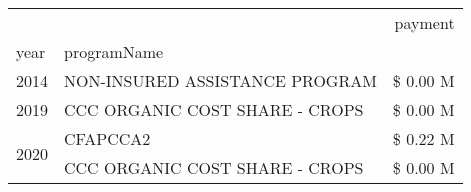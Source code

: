 \begin{tabular}{llr}
\toprule
 &  & payment \\
year & programName &  \\
\midrule
2014 & NON-INSURED ASSISTANCE PROGRAM & \$ 0.00 M \\
\cline{1-3}
2019 & CCC ORGANIC COST SHARE - CROPS & \$ 0.00 M \\
\cline{1-3}
\multirow[t]{2}{*}{2020} & CFAPCCA2 & \$ 0.22 M \\
 & CCC ORGANIC COST SHARE - CROPS & \$ 0.00 M \\
\cline{1-3}
\bottomrule
\end{tabular}
